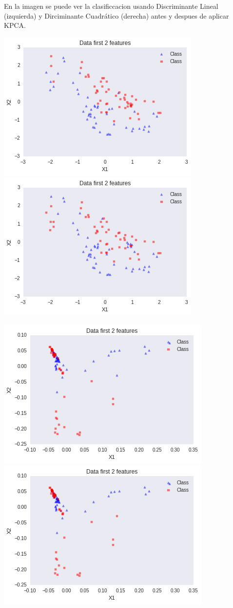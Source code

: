 \documentclass[fleqn,10pt]{SelfArx}
\begin{document}
En la imagen se puede ver la clasificcacion usando Discriminante Lineal (izquierda) y Dirciminante Cuadrático (derecha) antes y despues de aplicar KPCA.


\includegraphics[scale=0.5]{fig/LD_pred.png}
\includegraphics[scale=0.5]{fig/QD_Pred.png}

\includegraphics[scale=0.5]{fig/KPCA-LD_pred.png}
\includegraphics[scale=0.5]{fig/KPCA-QD_pred.png}
\end{document}
